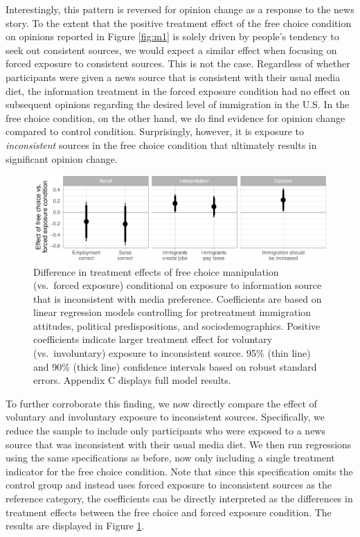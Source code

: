 \documentclass[
  12pt,
]{article}
\begin{document}
Interestingly, this pattern is reversed for opinion change as a response
to the news story. To the extent that the positive treatment effect of
the free choice condition on opinions reported in Figure \ref{fig:m1} is
solely driven by people's tendency to seek out consistent sources, we
would expect a similar effect when focusing on forced exposure to
consistent sources. This is not the case. Regardless of whether
participants were given a news source that is consistent with their
usual media diet, the information treatment in the forced exposure
condition had no effect on subsequent opinions regarding the desired
level of immigration in the U.S. In the free choice condition, on the
other hand, we do find evidence for opinion change compared to control
condition. Surprisingly, however, it is exposure to \emph{inconsistent}
sources in the free choice condition that ultimately results in
significant opinion change.

\singlespace

\begin{figure}
\centering
\includegraphics{ReliableSources_files/figure-latex/m4-1.pdf}
\caption{\label{fig:m4}Difference in treatment effects of free choice
manipulation (vs.~forced exposure) conditional on exposure to
information source that is inconsistent with media preference.
Coefficients are based on linear regression models controlling for
pretreatment immigration attitudes, political predispositions, and
sociodemographics. Positive coefficients indicate larger treatment
effect for voluntary (vs.~involuntary) exposure to inconsistent source.
95\% (thin line) and 90\% (thick line) confidence intervals based on
robust standard errors. Appendix C displays full model results.}
\end{figure}

\doublespace

\noindent To further corroborate this finding, we now directly compare
the effect of voluntary and involuntary exposure to inconsistent
sources. Specifically, we reduce the sample to include only participants
who were exposed to a news source that was inconsistent with their usual
media diet. We then run regressions using the same specifications as
before, now only including a single treatment indicator for the free
choice condition. Note that since this specification omits the control
group and instead uses forced exposure to inconsistent sources as the
reference category, the coefficients can be directly interpreted as the
differences in treatment effects between the free choice and forced
exposure condition. The results are displayed in Figure \ref{fig:m4}.
\end{document}
